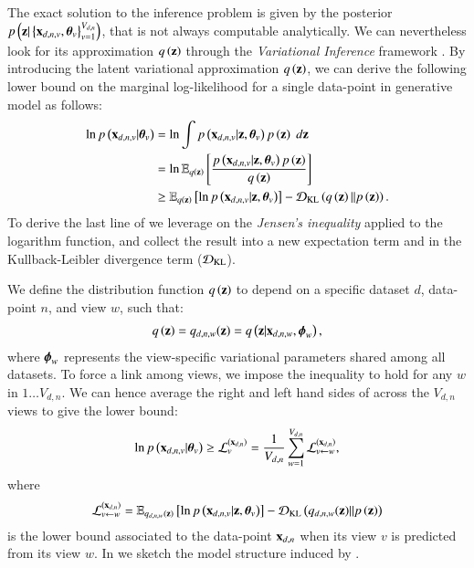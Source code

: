 The exact solution to the inference problem is given by the posterior $p\left(\mathbf{z}|\left\{\mathbf{x}_{d,n,v},\boldsymbol{\theta}_v\right\}_{v=1}^{V_{d,n}}\right)$, that is not always computable analytically.
We can nevertheless look for its approximation $q\left(\mathbf{z}\right)$ through the \textit{Variational Inference} framework \citep{Blei2017}.
By introducing the latent variational approximation $q\left(\mathbf{z}\right)$, we can derive the following lower bound on the marginal log-likelihood for a single data-point in generative model as follows:
\begin{equation}\label{eq:LB}
\begin{aligned}
\ln p\left(\mathbf{x}_{d,n,v}|\boldsymbol{\theta}_v\right) &= \ln \int p\left(\mathbf{x}_{d,n,v}|\mathbf{z}, \boldsymbol{\theta}_v\right) p\left(\mathbf{z}\right) \; d\mathbf{z} \\
                        &= \ln \operatorname{\mathbb{E}}_{q\left(\mathbf{z}\right)}\left[\frac{p\left(\mathbf{x}_{d,n,v}|\mathbf{z}, \boldsymbol{\theta}_v\right) p\left(\mathbf{z}\right)}{q\left(\mathbf{z}\right)}\right] \\
                        &\geq \operatorname{\mathbb{E}}_{q\left(\mathbf{z}\right)}\left[\ln p\left(\mathbf{x}_{d,n,v}|\mathbf{z}, \boldsymbol{\theta}_v\right)\right] - \operatorname{\mathcal{D}_{KL}}\left(q\left(\mathbf{z}\right)||p\left(\mathbf{z}\right)\right).
\end{aligned}
\end{equation}
To derive the last line of  we leverage on the \textit{Jensen's inequality} applied to the logarithm function, and collect the result into a new expectation term and in the Kullback-Leibler divergence term ($\operatorname{\mathcal{D}_{KL}}$).

We define the distribution function $q\left(\mathbf{z}\right)$ to depend on a specific dataset $d$, data-point $n$, and view $w$, such that:
\begin{equation}\label{eq:q}
\begin{aligned}
q\left(\mathbf{z}\right) = q_{d,n,w}(\mathbf{z}) = q\left(\mathbf{z}|\mathbf{x}_{d,n,w}, \boldsymbol{\phi}_w\right),
\end{aligned}
\end{equation}
where $\boldsymbol{\phi}_w$ represents the view-specific variational parameters shared among all datasets.
To force a link among views, we impose the inequality  to hold for any $w$ in $1 \ldots V_{d,n}$.
We can hence average the right and left hand sides of  across the $V_{d,n}$ views to give the lower bound:
\begin{equation}\label{eq:newLB}
\begin{aligned}
\ln p\left(\mathbf{x}_{d,n,v}|\boldsymbol{\theta}_v\right) \geq \mathcal{L}_v^{(\mathbf{x}_{d,n})} = \frac{1}{V_{d,n}} \sum_{w=1}^{V_{d,n}} \mathcal{L}_{v \leftarrow w}^{(\mathbf{x}_{d,n})},
\end{aligned}
\end{equation}
where
\begin{equation}\label{eq:LBdnvw}
\begin{aligned}
\mathcal{L}_{v \leftarrow w}^{(\mathbf{x}_{d,n})} = \operatorname{\mathbb{E}}_{q_{d,n,w}(\mathbf{z})}\left[\ln p\left(\mathbf{x}_{d,n,v}|\mathbf{z}, \boldsymbol{\theta}_v\right)\right] - \operatorname{\mathcal{D}_{KL}}\left(q_{d,n,w}(\mathbf{z})||p\left(\mathbf{z}\right)\right)
\end{aligned}
\end{equation}
is the lower bound associated to the data-point $\mathbf{x}_{d,n}$ when its view $v$ is predicted from its view $w$.
In  we sketch the model structure induced by .

